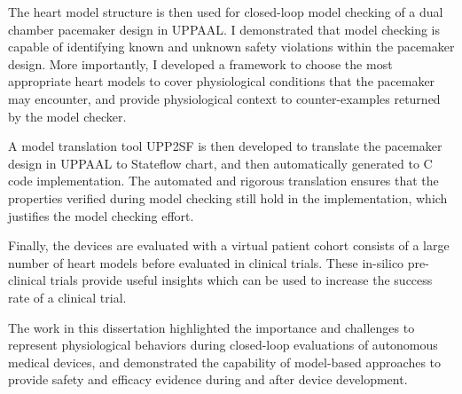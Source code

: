 \documentclass[12pt,letterpaper]{report}
\theoremstyle{definition}
\theoremstyle{remark}
\numberwithin{equation}{chapter}
\theoremstyle{plain} %
\begin{document}
The heart model structure is then used for closed-loop model checking of a dual chamber pacemaker design in UPPAAL.
I demonstrated that model checking is capable of identifying known and unknown safety violations within the pacemaker design.
More importantly, I developed a framework to choose the most appropriate heart models to cover physiological conditions that the pacemaker may encounter, and provide physiological context to counter-examples returned by the model checker.

A model translation tool UPP2SF is then developed to translate the pacemaker design in UPPAAL to Stateflow chart, and then automatically generated to C code implementation.
The automated and rigorous translation ensures that the properties verified during model checking still hold in the implementation, which justifies the model checking effort.

Finally, the devices are evaluated with a virtual patient cohort consists of a large number of heart models before evaluated in clinical trials.
These in-silico pre-clinical trials provide useful insights which can be used to increase the success rate of a clinical trial.

The work in this dissertation highlighted the importance and challenges to represent physiological behaviors during closed-loop evaluations of autonomous medical devices, and demonstrated the capability of model-based approaches to provide safety and efficacy evidence during and after device development.





 



\newpage
{}
\tableofcontents
\clearpage
{}
{}
\listoftables
\clearpage
{}
{}
\listoffigures




\newpage
{}








%
%
%
%
%
%
%
\end{document}
